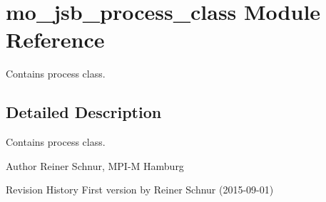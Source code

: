 \hypertarget{namespacemo__jsb__process__class}{}\section{mo\+\_\+jsb\+\_\+process\+\_\+class Module Reference}
\label{namespacemo__jsb__process__class}


Contains process class.  




\subsection{Detailed Description}
Contains process class. 

\begin{DoxyAuthor}{Author}
Reiner Schnur, M\+P\+I-\/\+M Hamburg
\end{DoxyAuthor}
\begin{DoxyParagraph}{Revision History}
First version by Reiner Schnur (2015-\/09-\/01) 
\end{DoxyParagraph}
